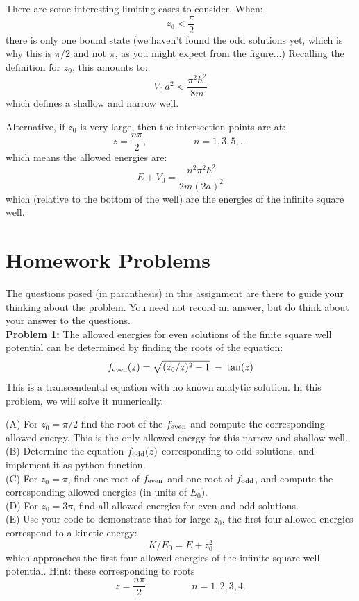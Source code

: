 \documentclass[12pt]{book}
\begin{document}
There are some interesting limiting cases to consider.  When:
$$z_0 < \frac{\pi}{2}$$
there is only one bound state (we haven't found the odd solutions yet, which is why this is $\pi/2$ and not $\pi$, as you might expect from the figure...)  Recalling the definition for $z_0$, this amounts to:
$$V_0\,a^2 < \frac{\pi^2 \hbar^2}{8m}$$
which defines a shallow and narrow well.

Alternative, if $z_0$ is very large, then the intersection points are at:
$$z = \frac{n\pi}{2}, \hspace{2cm} n=1,3,5,\ldots$$
which means the allowed energies are:
$$E + V_0 = \frac{n^2\pi^2\hbar^2}{2m(2a)^2}$$
which (relative to the bottom of the well) are the energies of the infinite square well.

\newpage
\section{Homework Problems}

The questions posed (in paranthesis) in this assignment are there to guide your thinking about the problem.  You need not record an answer, but do think about your answer to the questions.\\[5pt]

\noindent
{\bf Problem 1:}  The allowed energies for even solutions of the finite square well potential can be determined by finding the roots of the equation:
$$f_{\rm even}(z) = \sqrt{(z_0/z)^2-1} \; - \; \tan(z)$$
This is a transcendental equation with no known analytic solution.  In this problem, we will solve it numerically.

\noindent
(A) For $z_0 = \pi/2$ find the root of the $f_{\rm even}$ and compute the corresponding allowed energy.  This is the only allowed energy for this narrow and shallow well.\\[5pt]

\noindent
(B) Determine the equation $f_{\rm odd}(z)$ corresponding to odd solutions, and implement it as python function.\\[5pt]

\noindent
(C) For $z_0 = \pi$, find one root of $f_{\rm even}$ and one root of $f_{\rm odd}$, and compute the corresponding allowed energies (in units of $E_0$).\\[5pt]

\noindent
(D) For $z_0 = 3\pi$, find all allowed energies for even and odd solutions.\\[5pt]

\noindent
(E) Use your code to demonstrate that for large $z_0$, the first four allowed energies correspond to a kinetic energy:
$$K/E_0 = E + z_0^2$$
which approaches the first four allowed energies of the infinite square well potential.  Hint:  these corresponding to roots
$$z = \frac{n \pi}{2} \hspace{2cm} n=1,2,3,4.$$
\end{document}
